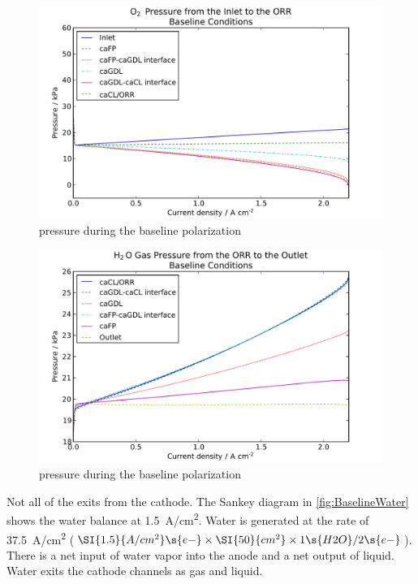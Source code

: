 \begin{figure}[htbp]
  \includegraphics[width=\linewidth]{Results/Cell/Model/1/PressureO2}%
  \caption{ pressure during the baseline polarization}%
  \label{fig:PressureO2}
\end{figure}

\begin{figure}[htbp]
  \includegraphics[width=\linewidth]{Results/Cell/Model/1/PressureH2O}%
  \caption{ pressure during the baseline polarization}%
  \label{fig:PressureH2O}
\end{figure}

Not all of the  exits from the cathode.  The Sankey diagram in \autoref{fig:BaselineWater} shows the water balance at \SI{1.5}{A/cm^2}.  Water is generated at the rate of \SI{37.5}{A/cm^2} ($\SI{1.5}{A/cm^2} \s{e-} \times \SI{50}{cm^2} \times 1 \s{H2O} / 2 \s{e-}$).  There is a net input of water vapor into the anode and a net output of liquid.  Water exits the cathode channels as gas and liquid.

